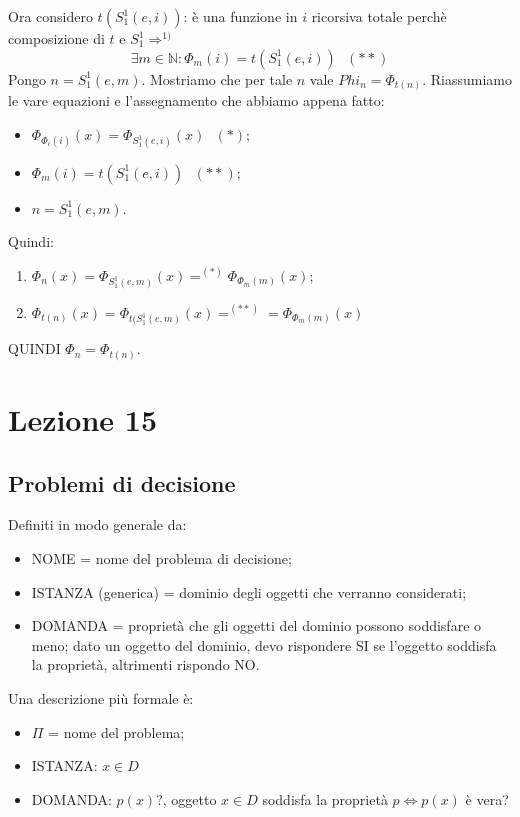 \documentclass{article}
\begin{document}
Ora considero $t(S_1^1(e,i))$: è una funzione in $i$ ricorsiva totale perchè composizione di $t$ e $S_1^1 \Rightarrow^{1)}$
\begin{displaymath}
	\exists m \in \mathbb{N}:\Phi_m(i)=t(S_1^1(e,i)) \textit{   } (**)
\end{displaymath}
Pongo $n=S_1^1(e,m)$. Mostriamo che per tale $n$ vale $Phi_n=\Phi_{t(n)}$.
Riassumiamo le vare equazioni e l'assegnamento che abbiamo appena fatto:
\begin{itemize}
	\item $\Phi_{\Phi_i(i)}(x) =  \Phi_{S_1^1(e,i)}(x) \textit{   } (*)$;
	\item $\Phi_m(i)=t(S_1^1(e,i)) \textit{   } (**)$;
	\item $n=S_1^1(e,m)$.
\end{itemize}
Quindi:
\begin{enumerate}
	\item $\Phi_n(x) = \Phi_{S_1^1(e,m)}(x) =^{(*)} \Phi_{\Phi_m(m)}(x)$;
	\item $\Phi_{t(n)}(x) = \Phi_{t(S_1^1(e,m)}(x) =^{(**)} = \Phi_{\Phi_m(m)}(x)$
\end{enumerate}
QUINDI $\Phi_n=\Phi_{t(n)}$.

\section{Lezione 15}
\subsection{Problemi di decisione}
Definiti in modo generale da:
\begin{itemize}
	\item NOME = nome del problema di decisione;
	\item ISTANZA (generica) = dominio degli oggetti che verranno considerati;
	\item DOMANDA = proprietà che gli oggetti del dominio possono soddisfare o meno; dato un oggetto del dominio, devo rispondere SI se l'oggetto soddisfa la proprietà, altrimenti rispondo NO.
\end{itemize}
Una descrizione più formale è:
\begin{itemize}
	\item $\Pi$ = nome del problema;
	\item ISTANZA: $x \in D$
	\item DOMANDA: $p(x)?$, oggetto $x \in D$ soddisfa la proprietà $p \Leftrightarrow p(x)$ è vera? 
\end{itemize}
\end{document}
